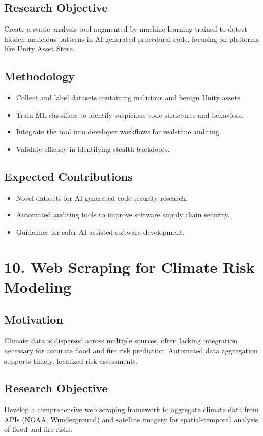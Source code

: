 \documentclass[11pt]{article}
\begin{document}
\subsection{Research Objective}
\label{sec:org4211676}
Create a static analysis tool augmented by machine learning trained to detect hidden malicious patterns in AI-generated procedural code, focusing on platforms like Unity Asset Store.
\subsection{Methodology}
\label{sec:org7e64123}
\begin{itemize}
\item Collect and label datasets containing malicious and benign Unity assets.
\item Train ML classifiers to identify suspicious code structures and behaviors.
\item Integrate the tool into developer workflows for real-time auditing.
\item Validate efficacy in identifying stealth backdoors.
\end{itemize}
\subsection{Expected Contributions}
\label{sec:org9ead3ac}
\begin{itemize}
\item Novel datasets for AI-generated code security research.
\item Automated auditing tools to improve software supply chain security.
\item Guidelines for safer AI-assisted software development.
\end{itemize}
\section{10. Web Scraping for Climate Risk Modeling}
\label{sec:orgb7023d2}
\subsection{Motivation}
\label{sec:org0079a31}
Climate data is dispersed across multiple sources, often lacking integration necessary for accurate flood and fire risk prediction. Automated data aggregation supports timely, localized risk assessments.
\subsection{Research Objective}
\label{sec:org031b4e0}
Develop a comprehensive web scraping framework to aggregate climate data from APIs (NOAA, Wunderground) and satellite imagery for spatial-temporal analysis of flood and fire risks.
\end{document}
